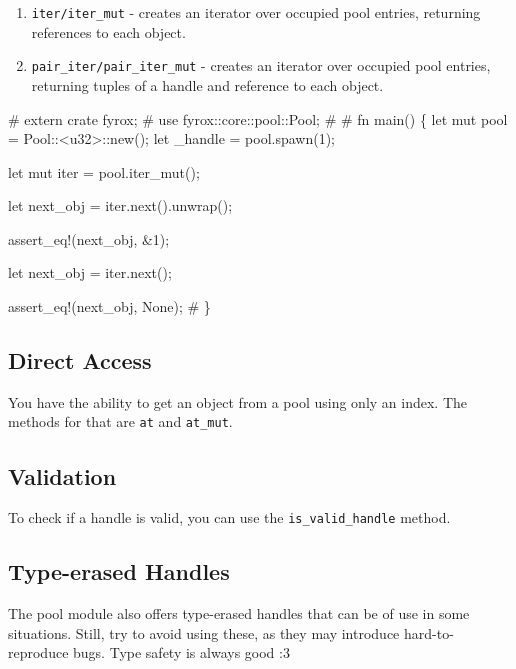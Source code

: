\documentclass[
]{book}
\newenvironment{Shaded}{\begin{snugshade}}{\end{snugshade}}
\newcommand{\NormalTok}[1]{#1}
\providecommand{\tightlist}{%
  \setlength{\itemsep}{0pt}\setlength{\parskip}{0pt}}
\theoremstyle{definition}
\theoremstyle{definition}
\theoremstyle{definition}
\theoremstyle{definition}
\theoremstyle{remark}
\begin{document}
\begin{enumerate}
\def\labelenumi{\arabic{enumi})}
\tightlist
\item
  \texttt{iter/iter\_mut} - creates an iterator over occupied pool entries, returning references to each object.
\item
  \texttt{pair\_iter/pair\_iter\_mut} - creates an iterator over occupied pool entries, returning tuples of a handle and reference to each object.
\end{enumerate}

\begin{Shaded}
\begin{Highlighting}[]
\NormalTok{\# extern crate fyrox;}
\NormalTok{\# use fyrox::core::pool::Pool;}
\NormalTok{\#}
\NormalTok{\# fn main() \{}
\NormalTok{let mut pool = Pool::\textless{}u32\textgreater{}::new();}
\NormalTok{let \_handle = pool.spawn(1);}

\NormalTok{let mut iter = pool.iter\_mut();}

\NormalTok{let next\_obj = iter.next().unwrap();}

\NormalTok{assert\_eq!(next\_obj, \&1);}

\NormalTok{let next\_obj = iter.next();}

\NormalTok{assert\_eq!(next\_obj, None);}
\NormalTok{\# \}}
\end{Highlighting}
\end{Shaded}

\subsection{Direct Access}\label{direct-access}

You have the ability to get an object from a pool using only an index. The methods for that are \texttt{at} and \texttt{at\_mut}.

\subsection{Validation}\label{validation}

To check if a handle is valid, you can use the \texttt{is\_valid\_handle} method.

\subsection{Type-erased Handles}\label{type-erased-handles}

The pool module also offers type-erased handles that can be of use in some situations. Still, try to avoid using these, as they may introduce hard-to-reproduce bugs. Type safety is always good :3
\end{document}
